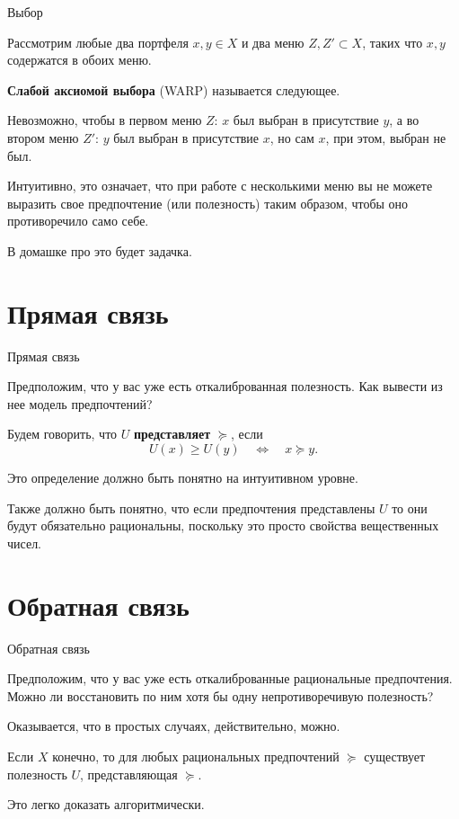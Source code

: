 \documentclass{beamer}
\begin{document}
\begin{frame}{Выбор}

Рассмотрим любые два портфеля $x, y \in X$ и два меню $Z,Z' \subset X$, таких что $x,y$ содержатся в обоих меню.

\begin{definition} 
\textbf{Слабой аксиомой выбора} (WARP) называется следующее. 

Невозможно, чтобы в первом меню $Z$: $x$ был выбран в присутствие $y$, а во втором меню $Z'$: $y$ был выбран в присутствие $x$, но сам $x$, при этом,  выбран не был.
\end{definition}

Интуитивно, это означает, что при работе с несколькими меню вы не можете выразить свое предпочтение (или полезность) таким образом, чтобы оно противоречило само себе.

В домашке про это будет задачка.

\end{frame}

\section{Прямая связь}

\begin{frame}{Прямая связь}

Предположим, что у вас уже есть откалиброванная полезность. Как вывести из нее модель предпочтений?

\begin{definition}
Будем говорить, что $U$ \textbf{представляет} $\succcurlyeq$, если
$$ U(x) \geqslant U(y) \quad \Leftrightarrow \quad  x \succcurlyeq y.$$
\end{definition}

Это определение должно быть понятно на интуитивном уровне. 

Также должно быть понятно, что если предпочтения представлены $U$ то они будут обязательно рациональны, поскольку это просто свойства вещественных чисел.

\end{frame}

\section{Обратная связь}

\begin{frame}{Обратная связь}

Предположим, что у вас уже есть откалиброванные рациональные предпочтения. Можно ли восстановить по ним хотя бы одну непротиворечивую полезность? 

Оказывается, что в простых случаях, действительно, можно.

\begin{lemma}
Если $X$ конечно, то для любых рациональных предпочтений $\succcurlyeq$ существует полезность $U$, представляющая $\succcurlyeq$.
\end{lemma}

Это легко доказать алгоритмически.

\end{frame}
\end{document}
